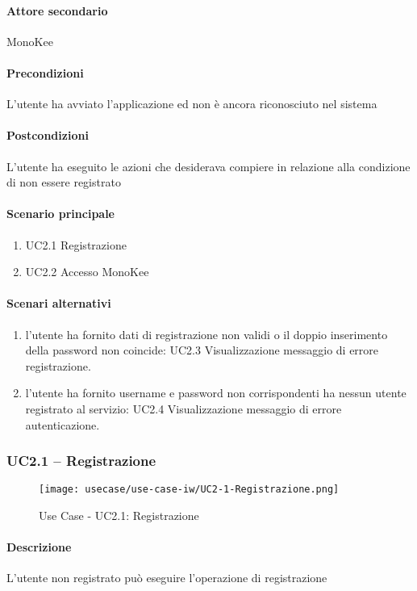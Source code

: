 \paragraph{Attore secondario}  MonoKee
\paragraph{Precondizioni}  L’utente ha avviato l’applicazione ed non è ancora riconosciuto nel sistema
\paragraph{Postcondizioni}  L’utente ha eseguito le azioni che desiderava compiere in relazione alla condizione di non essere registrato
\paragraph{Scenario principale}  
    \begin{enumerate}
        \item UC2.1 Registrazione
        \item UC2.2 Accesso MonoKee
    \end{enumerate}
\paragraph{Scenari alternativi}  
    \begin{enumerate}
        \item l’utente ha fornito dati di registrazione non validi o il doppio inserimento della password non coincide: UC2.3 Visualizzazione messaggio di errore registrazione.
        \item l’utente ha fornito username e password non corrispondenti ha nessun utente registrato al servizio: UC2.4 Visualizzazione messaggio di errore autenticazione.
    \end{enumerate}


\subsubsection{UC2.1 – Registrazione}
\begin{figure}[!htbp] 
    \centering 
    \texttt{[image: usecase/use-case-iw/UC2-1-Registrazione.png]} 
    \caption{Use Case - UC2.1: Registrazione}
\end{figure}

\paragraph{Descrizione}  L’utente non registrato può eseguire l’operazione di registrazione 
